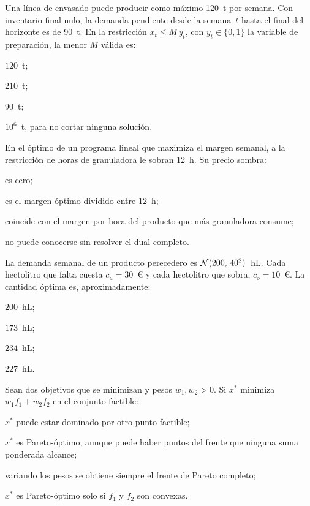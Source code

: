 \begin{cuestiones}
\item {} Una línea de envasado puede producir como máximo 120~t por semana. Con inventario final nulo, la demanda pendiente desde la semana~$t$ hasta el final del horizonte es de 90~t. En la restricción $x_t\le M\,y_t$, con $y_t\in\{0,1\}$ la variable de preparación, la menor $M$ válida es:
\begin{opciones}
  \item $120$~t;
  \item $210$~t;
  \item $90$~t;
  \item $10^{6}$~t, para no cortar ninguna solución.
\end{opciones}

\item {} En el óptimo de un programa lineal que maximiza el margen semanal, a la restricción de horas de granuladora le sobran 12~h. Su precio sombra:
\begin{opciones}
  \item es cero;
  \item es el margen óptimo dividido entre 12~h;
  \item coincide con el margen por hora del producto que más granuladora consume;
  \item no puede conocerse sin resolver el dual completo.
\end{opciones}

\item {} La demanda semanal de un producto perecedero es $\mathcal{N}(200,\,40^{2})$~hL. Cada hectolitro que falta cuesta $c_u=30$~€ y cada hectolitro que sobra, $c_o=10$~€. La cantidad óptima es, aproximadamente:
\begin{opciones}
  \item $200$~hL;
  \item $173$~hL;
  \item $234$~hL;
  \item $227$~hL.
\end{opciones}

\item {} Sean dos objetivos que se minimizan y pesos $w_1,w_2>0$. Si $x^{\ast}$ minimiza $w_1f_1+w_2f_2$ en el conjunto factible:
\begin{opciones}
  \item $x^{\ast}$ puede estar dominado por otro punto factible;
  \item $x^{\ast}$ es Pareto-óptimo, aunque puede haber puntos del frente que ninguna suma ponderada alcance;
  \item variando los pesos se obtiene siempre el frente de Pareto completo;
  \item $x^{\ast}$ es Pareto-óptimo solo si $f_1$ y $f_2$ son convexas.
\end{opciones}
\end{cuestiones}

